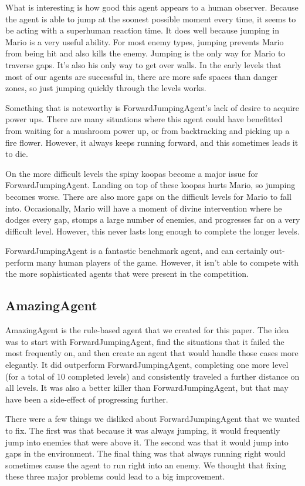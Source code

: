 \documentclass[12pt]{article}
\begin{document}
\begin{multicols*}{2}
What is interesting is how good this agent appears to a human observer.  Because the agent 
is able to jump at the soonest possible moment every time, it seems to be acting with a 
superhuman reaction time.  It does well because jumping in Mario is a very useful ability.  For 
most enemy types, jumping prevents Mario from being hit and also kills the enemy.  Jumping is the 
only way for Mario to traverse gaps.  It's also his only way to get over walls.  In the early levels that 
most of our agents are successful in, there are more safe spaces than danger zones, so just 
jumping quickly through the levels works.

Something that is noteworthy is ForwardJumpingAgent's lack of desire to acquire power ups.  There 
are many situations where this agent could have benefitted from waiting for a mushroom power up, or 
from backtracking and picking up a fire flower.  However, it always keeps running forward, and this 
sometimes leads it to die.

On the more difficult levels the spiny koopas become a major issue for ForwardJumpingAgent.  
Landing on top of these koopas hurts Mario, so jumping becomes worse.  There are also more gaps 
on the difficult levels for Mario to fall into.  Occasionally, Mario will have a moment of divine 
intervention where he dodges every gap, stomps a large number of enemies, and progresses far 
on a very difficult level.  However, this never lasts long enough to complete the longer levels.

ForwardJumpingAgent is a fantastic benchmark agent, and can certainly out-perform many 
human players of the game.  However, it isn't able to compete with the more sophisticated agents 
that were present in the competition.

\subsection*{AmazingAgent}
AmazingAgent is the rule-based agent that we created for this paper.  The idea was to start with 
ForwardJumpingAgent, find the situations that it failed the most frequently on, and then create 
an agent that would handle those cases more elegantly.  It did outperform ForwardJumpingAgent, 
completing one more level (for a total of 10 completed levels) and consistently traveled a further 
distance on all levels.  It was also a better killer than ForwardJumpingAgent, but that may have 
been a side-effect of progressing further.

There were a few things we disliked about ForwardJumpingAgent that we wanted to fix.  The 
first was that because it was always jumping, it would frequently jump into enemies that were above 
it.  The second was that it would jump into gaps in the environment.  The final thing was that always 
running right would sometimes cause the agent to run right into an enemy.  We thought that fixing these 
three major problems could lead to a big improvement.


\end{multicols*}
\end{document}
